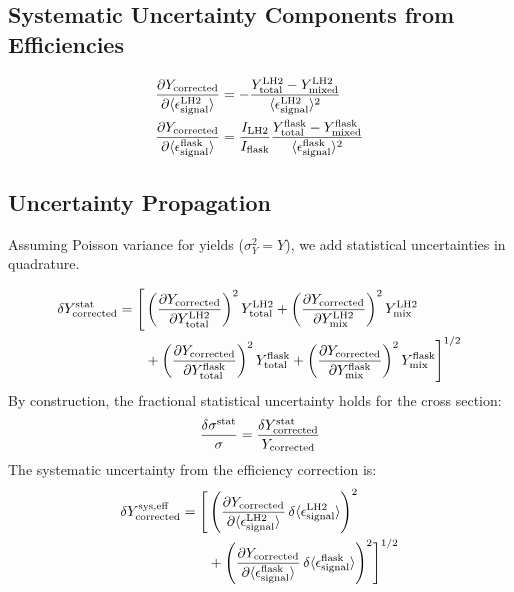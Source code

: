 \documentclass[11pt]{article}
\begin{document}
\subsection*{Systematic Uncertainty Components from Efficiencies}

\begin{align}
\frac{\partial Y_{\rm corrected}}{\partial \langle\epsilon^{\textrm{LH2}}_{\textrm{signal}}\rangle} &= -\frac{Y^{\textrm{LH2}}_{\textrm{total}} - Y^{\textrm{LH2}}_{\textrm{mixed}}}{\langle\epsilon^{\textrm{LH2}}_{\textrm{signal}}\rangle^2} \\
\frac{\partial Y_{\rm corrected}}{\partial \langle\epsilon^{\textrm{flask}}_{\textrm{signal}}\rangle} &= \frac{I_{\textrm{LH2}}}{I_{\textrm{flask}}} \frac{Y^{\textrm{flask}}_{\textrm{total}} - Y^{\textrm{flask}}_{\textrm{mixed}}}{\langle\epsilon^{\textrm{flask}}_{\textrm{signal}}\rangle^2}
\end{align}

\subsection*{Uncertainty Propagation}
Assuming Poisson variance for yields ($\sigma^2_Y = Y$), we add statistical uncertainties in quadrature.

\begin{equation}
\begin{split}
\delta Y^{\rm stat}_{\rm corrected} = 
\Biggl[ & \left( \frac{\partial Y_{\rm corrected}}{\partial Y^{\textrm{LH2}}_{\textrm{total}} } \right)^2 Y^{\textrm{LH2}}_{\textrm{total}} 
+ \left( \frac{\partial Y_{\rm corrected}}{\partial Y^{\textrm{LH2}}_{\textrm{mix}} } \right)^2 Y^{\textrm{LH2}}_{\textrm{mix}} \\
& + \left( \frac{\partial Y_{\rm corrected}}{\partial Y^{\textrm{flask}}_{\textrm{total}} } \right)^2 Y^{\textrm{flask}}_{\textrm{total}} 
+ \left( \frac{\partial Y_{\rm corrected}}{\partial Y^{\textrm{flask}}_{\textrm{mix}} } \right)^2 Y^{\textrm{flask}}_{\textrm{mix}} \Biggr]^{1/2}
\end{split}
\end{equation}
By construction, the fractional statistical uncertainty holds for the cross section:
\begin{equation}
\frac{\delta \sigma^{\rm stat}}{\sigma} = \frac{\delta Y^{\rm stat}_{\rm corrected}}{Y_{\rm corrected}}
\end{equation}
The systematic uncertainty from the efficiency correction is:
\begin{equation}
\begin{split}
\delta Y^{\rm sys, eff}_{\rm corrected} = 
\Biggl[ & \left( \frac{\partial Y_{\rm corrected}}{\partial \langle\epsilon^{\textrm{LH2}}_{\textrm{signal}}\rangle} \, \delta \langle\epsilon^{\textrm{LH2}}_{\textrm{signal}}\rangle \right)^2 \\
& + \left( \frac{\partial Y_{\rm corrected}}{\partial \langle\epsilon^{\textrm{flask}}_{\textrm{signal}}\rangle} \, \delta \langle\epsilon^{\textrm{flask}}_{\textrm{signal}}\rangle \right)^2 \Biggr]^{1/2}
\end{split}
\end{equation}
\end{document}
